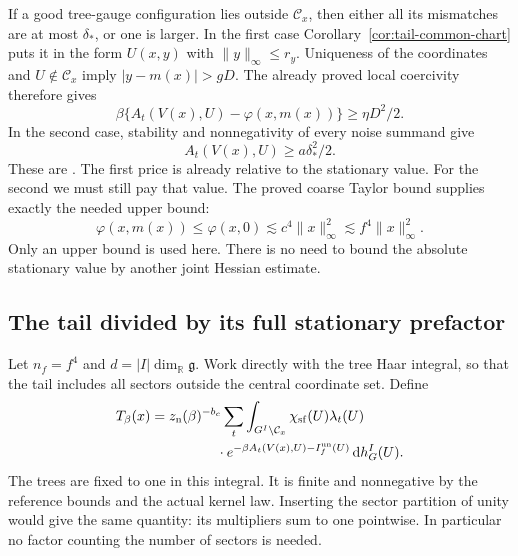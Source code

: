\documentclass[11pt,reqno]{amsart}
\numberwithin{equation}{section}
\theoremstyle{definition}
\theoremstyle{remark}
\newcommand{\R}{\mathbb R}
\newcommand{\dd}{\mathrm d}
\newcommand{\g}{\mathfrak g}
\begin{document}
If a good tree-gauge configuration lies outside
\(\mathcal C_x\), then either all its mismatches are at
most \(\delta_*\), or one is larger. In the first case
Corollary~\ref{cor:tail-common-chart} puts it in the form
\(U(x,y)\) with \(\|y\|_\infty\le r_y\). Uniqueness
of the coordinates and \(U\notin\mathcal C_x\) imply
\(|y-m(x)|>gD\). The already proved local coercivity
therefore gives
\begin{equation}
       \beta\{A_t(V(x),U)-\varphi(x,m(x))\}
                                   \ge\eta D^2/2.
 \label{eq:tail-small-mismatch-price}
\end{equation}
In the second case, stability and nonnegativity of every
noise summand give
\begin{equation}
                             A_t(V(x),U)\ge a\delta_*^2/2.
 \label{eq:tail-large-mismatch-price}
\end{equation}
These are \cite[Proposition~15.3, (15.4)--(15.5), p.~75]{Main}.
The first price is already relative to the stationary value.
For the second we must still pay that value. The proved
coarse Taylor bound supplies exactly the needed upper bound:
\begin{equation}
       \varphi(x,m(x))\le\varphi(x,0)
                   \lesssim c^4\|x\|_\infty^2
                   \lesssim f^4\|x\|_\infty^2.
 \label{eq:tail-centre-energy-price}
\end{equation}
Only an upper bound is used here. There is no need to bound
the absolute stationary value by another joint Hessian estimate.

\subsection{The tail divided by its full stationary prefactor}

Let \(n_f=f^4\) and \(d=|I|\dim_{\R}\g\). Work directly
with the tree Haar integral, so that the tail includes all
sectors outside the central coordinate set. Define
\begin{equation}
 \begin{split}
 T_\beta(x)={}&z_{\mathrm n}(\beta)^{-b_c}
       \sum_t\int_{G^I\setminus\mathcal C_x}
          \chi_{\rm sf}(U)\lambda_t(U)\\
       &\hspace{12mm}\cdot
          e^{-\beta A_t(V(x),U)-I_f^{\rm un}(U)}\,\dd h_G^I(U).
 \end{split}
 \label{eq:tail-full-physical-integral}
\end{equation}
The trees are fixed to one in this integral. It is finite and
nonnegative by the reference bounds and the actual kernel law.
Inserting the sector partition of unity would give the same
quantity: its multipliers sum to one pointwise. In particular
no factor counting the number of sectors is needed.
\end{document}
